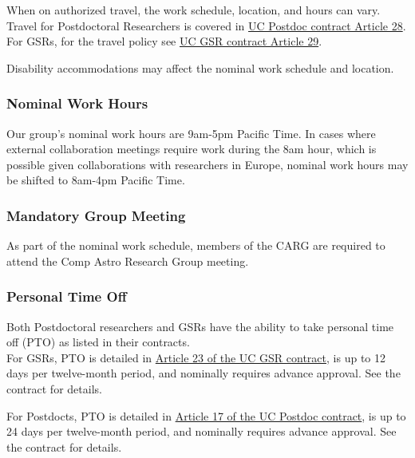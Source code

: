 \noindent
When on authorized travel, the work schedule, location, and hours can vary. Travel for Postdoctoral Researchers is covered in \href{https://ucnet.universityofcalifornia.edu/wp-content/uploads/labor/bargaining-units/px/docs/px_tentative_agremeents_effective_12-09-2022.pdf}{UC Postdoc contract Article 28}. For GSRs, for the travel policy see \href{https://qa.ucnet.universityofcalifornia.edu/labor/bargaining-units/br/docs/br_29_travel_2022-2025.pdf}{UC GSR contract Article 29}.

\noindent
Disability accommodations may affect the nominal work schedule and location.

\subsubsection{Nominal Work Hours}
\label{sec:nominal_work_hours}

Our group's nominal work hours are 9am-5pm Pacific Time. In cases where external collaboration meetings require work during the 8am hour, which is possible given collaborations with researchers in Europe, nominal work hours may be shifted to 8am-4pm Pacific Time.

\subsubsection{Mandatory Group Meeting}

As part of the nominal work schedule, members of the CARG are required to attend the Comp Astro Research Group meeting.

\subsubsection{Personal Time Off}

Both Postdoctoral researchers and GSRs have the ability to take personal time off (PTO) as listed in their contracts.\\

\noindent
For GSRs, PTO is
detailed in \href{https://ucnet.universityofcalifornia.edu/wp-content/uploads/labor/bargaining-units/br/docs/br_23_personal-time-off_2022-2025.pdf}{Article 23 of the UC GSR contract}, is up to 12 days per twelve-month period, and nominally requires advance approval. See the contract for details.


\noindent
For Postdocts, PTO is detailed in \href{https://ucnet.universityofcalifornia.edu/wp-content/uploads/labor/bargaining-units/px/docs/px_tentative_agremeents_effective_12-09-2022.pdf}{Article 17 of the UC Postdoc contract}, is up to 24 days per twelve-month period, and nominally requires advance approval. See the contract for details.


